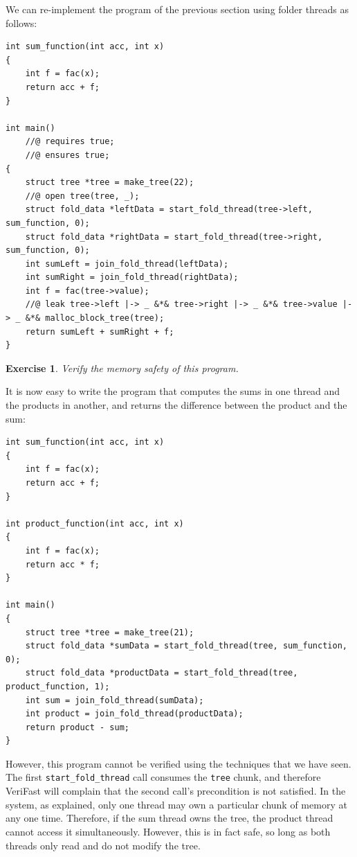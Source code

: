 \documentclass{article}
\newtheorem{exercise}{Exercise}
\begin{document}
We can re-implement the program of the previous section using folder threads as follows:
\begin{lstlisting}
int sum_function(int acc, int x)
{
    int f = fac(x);
    return acc + f;
}

int main()
    //@ requires true;
    //@ ensures true;
{
    struct tree *tree = make_tree(22);
    //@ open tree(tree, _);
    struct fold_data *leftData = start_fold_thread(tree->left, sum_function, 0);
    struct fold_data *rightData = start_fold_thread(tree->right, sum_function, 0);
    int sumLeft = join_fold_thread(leftData);
    int sumRight = join_fold_thread(rightData);
    int f = fac(tree->value);
    //@ leak tree->left |-> _ &*& tree->right |-> _ &*& tree->value |-> _ &*& malloc_block_tree(tree);
    return sumLeft + sumRight + f;
}
\end{lstlisting}

\begin{exercise}\label{exercise:fractions0}
Verify the memory safety of this program.
\end{exercise}

It is now easy to write the program that computes the sums in
one thread and the products in another, and returns the
difference between the product and the sum:
\begin{lstlisting}
int sum_function(int acc, int x)
{
    int f = fac(x);
    return acc + f;
}

int product_function(int acc, int x)
{
    int f = fac(x);
    return acc * f;
}

int main()
{
    struct tree *tree = make_tree(21);
    struct fold_data *sumData = start_fold_thread(tree, sum_function, 0);
    struct fold_data *productData = start_fold_thread(tree, product_function, 1);
    int sum = join_fold_thread(sumData);
    int product = join_fold_thread(productData);
    return product - sum;
}
\end{lstlisting}

However, this program cannot be verified using the techniques
that we have seen. The first \lstinline!start_fold_!\-\lstinline!thread! call
consumes the \lstinline!tree! chunk, and therefore VeriFast
will complain that the second call's precondition is not
satisfied. In the system, as explained, only one thread may own
a particular chunk of memory at any one time. Therefore, if the
sum thread owns the tree, the product thread cannot access it
simultaneously. However, this is in fact safe, so long as both
threads only read and do not modify the tree.
\end{document}
